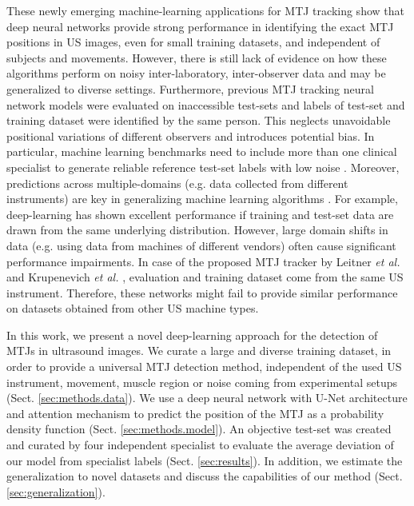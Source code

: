 \documentclass[journal,twoside,web]{ieeecolor}
\begin{document}
These newly emerging machine-learning applications for MTJ tracking show that deep neural networks provide strong performance in identifying the exact MTJ positions in US images, even for small training datasets, and independent of subjects and movements. However, there is still lack of evidence on how these algorithms perform on noisy inter-laboratory, inter-observer data and may be generalized to diverse settings. Furthermore, previous MTJ tracking neural network models were evaluated on inaccessible test-sets and labels of test-set and training dataset were identified by the same person. This neglects unavoidable positional variations of different observers and introduces potential bias. In particular, machine learning benchmarks need to include more than one clinical specialist to generate reliable reference test-set labels \cite{j:Hernandez2021, j:Li2020, j:Titano2018} with low noise \cite{j:Karimi2020}. Moreover, predictions across multiple-domains (e.g. data collected from different instruments) are key in generalizing machine learning algorithms \cite{j:Zech2018}. For example, deep-learning has shown excellent performance if training and test-set data are drawn from the same underlying distribution. However, large domain shifts in data (e.g. using data from machines of different vendors) often cause significant performance impairments. In case of the proposed MTJ tracker by Leitner \textit{et al.} \cite{c:LeitnerJarolim2020} and Krupenevich \textit{et al.} \cite{j:Krupenevich2021}, evaluation and training dataset come from the same US instrument. Therefore, these networks might fail to provide similar performance on datasets obtained from other US machine types.

In this work, we present a novel deep-learning approach for the detection of MTJs in ultrasound images. We curate a large and diverse training dataset, in order to provide a universal MTJ detection method, independent of the used US instrument, movement, muscle region or noise coming from experimental setups (Sect. \ref{sec:methods.data}). We use a deep neural network with U-Net architecture and attention mechanism to predict the position of the MTJ as a probability density function (Sect. \ref{sec:methods.model}). An objective test-set was created and curated by four independent specialist to evaluate the average deviation of our model from specialist labels (Sect. \ref{sec:results}). In addition, we estimate the generalization to novel datasets and discuss the capabilities of our method (Sect. \ref{sec:generalization}).
\end{document}
